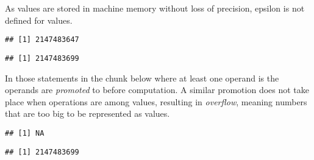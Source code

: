 \documentclass[krantz2]{krantz}\usepackage{knitr}
\begin{document}
\begin{explainbox}
As  values are stored in machine memory without loss of precision, epsilon is not defined for  values.

\begin{knitrout}\footnotesize
{}\color{fgcolor}\begin{kframe}
\begin{alltt}
\hlopt{$}
\end{alltt}
\begin{verbatim}
## [1] 2147483647
\end{verbatim}
\begin{alltt}
\end{alltt}
\begin{verbatim}
## [1] 2147483699
\end{verbatim}
\end{kframe}
\end{knitrout}

In those statements in the chunk below where at least one operand is  the  operands are \emph{promoted} to  before computation. A similar promotion does not take place when operations are among  values, resulting in \emph{overflow}, meaning numbers that are too big to be represented as  values.

\begin{knitrout}\footnotesize
{}\color{fgcolor}\begin{kframe}
\begin{alltt}
 \hlopt{+} 
\end{alltt}


{\ttfamily\noindent\color{warningcolor}{\#\# Warning in 2147483600L + 99L: NAs produced by integer overflow}}\begin{verbatim}
## [1] NA
\end{verbatim}
\begin{alltt}
 \hlopt{+} 
\end{alltt}
\begin{verbatim}
## [1] 2147483699
\end{verbatim}
\begin{alltt}
 \hlopt{*} 
\end{alltt}



\end{kframe}
\end{knitrout}
\end{explainbox}
\end{document}
